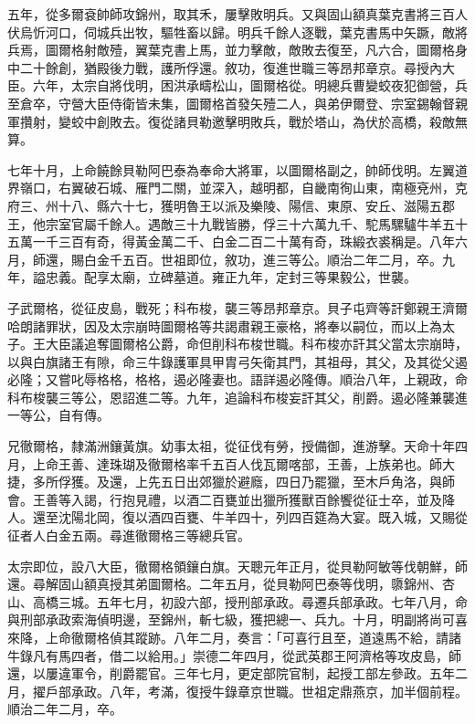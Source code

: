 \begin{pinyinscope}
五年，從多爾袞帥師攻錦州，取其禾，屢擊敗明兵。又與固山額真葉克書將三百人伏烏忻河口，伺城兵出牧，驅牲畜以歸。明兵千餘人逐戰，葉克書馬中矢蹶，敵將兵焉，圖爾格射敵殪，翼葉克書上馬，並力擊敵，敵敗去復至，凡六合，圖爾格身中二十餘創，猶殿後力戰，護所俘還。敘功，復進世職三等昂邦章京。尋授內大臣。六年，太宗自將伐明，困洪承疇松山，圖爾格從。明總兵曹變蛟夜犯御營，兵至倉卒，守營大臣侍衛皆未集，圖爾格首發矢殪二人，與弟伊爾登、宗室錫翰督親軍攢射，變蛟中創敗去。復從諸貝勒邀擊明敗兵，戰於塔山，為伏於高橋，殺敵無算。

七年十月，上命饒餘貝勒阿巴泰為奉命大將軍，以圖爾格副之，帥師伐明。左翼道界嶺口，右翼破石城、雁門二關，並深入，越明都，自畿南徇山東，南極兗州，克府三、州十八、縣六十七，獲明魯王以派及樂陵、陽信、東原、安丘、滋陽五郡王，他宗室官屬千餘人。遇敵三十九戰皆勝，俘三十六萬九千、駝馬騾驢牛羊五十五萬一千三百有奇，得黃金萬二千、白金二百二十萬有奇，珠緞衣裘稱是。八年六月，師還，賜白金千五百。世祖即位，敘功，進三等公。順治二年二月，卒。九年，謚忠義。配享太廟，立碑墓道。雍正九年，定封三等果毅公，世襲。

子武爾格，從征皮島，戰死；科布梭，襲三等昂邦章京。貝子屯齊等訐鄭親王濟爾哈朗諸罪狀，因及太宗崩時圖爾格等共謁肅親王豪格，將奉以嗣位，而以上為太子。王大臣議追奪圖爾格公爵，命但削科布梭世職。科布梭亦訐其父當太宗崩時，以與白旗諸王有隙，命三牛錄護軍具甲胄弓矢衛其門，其祖母，其父，及其從父遏必隆；又嘗叱辱格格，格格，遏必隆妻也。語詳遏必隆傳。順治八年，上親政，命科布梭襲三等公，恩詔進二等。九年，追論科布梭妄訐其父，削爵。遏必隆兼襲進一等公，自有傳。

兄徹爾格，隸滿洲鑲黃旗。幼事太祖，從征伐有勞，授備御，進游擊。天命十年四月，上命王善、達珠瑚及徹爾格率千五百人伐瓦爾喀部，王善，上族弟也。師大捷，多所俘獲。及還，上先五日出郊獵於避廕，四日乃罷獵，至木戶角洛，與師會。王善等入謁，行抱見禮，以酒二百甕並出獵所獲獸百餘饗從征士卒，並及降人。還至沈陽北岡，復以酒四百甕、牛羊四十，列四百筵為大宴。既入城，又賜從征者人白金五兩。尋進徹爾格三等總兵官。

太宗即位，設八大臣，徹爾格領鑲白旗。天聰元年正月，從貝勒阿敏等伐朝鮮，師還。尋解固山額真授其弟圖爾格。二年五月，從貝勒阿巴泰等伐明，隳錦州、杏山、高橋三城。五年七月，初設六部，授刑部承政。尋遷兵部承政。七年八月，命與刑部承政索海偵明邊，至錦州，斬七級，獲把總一、兵九。十月，明副將尚可喜來降，上命徹爾格偵其蹤跡。八年二月，奏言：「可喜行且至，道遠馬不給，請諸牛錄凡有馬四者，借二以給用。」崇德二年四月，從武英郡王阿濟格等攻皮島，師還，以屢違軍令，削爵罷官。三年七月，更定部院官制，起授工部左參政。五年二月，擢戶部承政。八年，考滿，復授牛錄章京世職。世祖定鼎燕京，加半個前程。順治二年二月，卒。


\end{pinyinscope}
